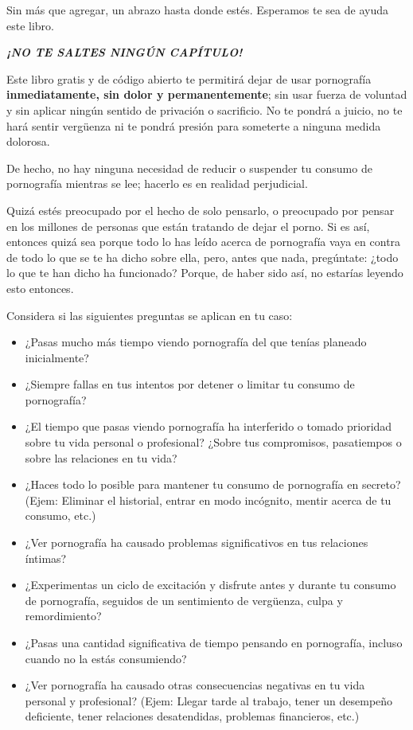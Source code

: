 \documentclass[
  spanish,
  openany]{book}
\providecommand{\tightlist}{%
  \setlength{\itemsep}{0pt}\setlength{\parskip}{0pt}}
\begin{document}
Sin más que agregar, un abrazo hasta donde estés. Esperamos te sea de ayuda este libro.

{\emph{\textbf{¡NO TE SALTES NINGÚN CAPÍTULO!}}}

Este libro gratis y de código abierto te permitirá dejar de usar pornografía \textbf{inmediatamente, sin dolor y permanentemente}; sin usar fuerza de voluntad y sin aplicar ningún sentido de privación o sacrificio. No te pondrá a juicio, no te hará sentir vergüenza ni te pondrá presión para someterte a ninguna medida dolorosa.

De hecho, no hay ninguna necesidad de reducir o suspender tu consumo de pornografía mientras se lee; hacerlo es en realidad perjudicial.

Quizá estés preocupado por el hecho de solo pensarlo, o preocupado por pensar en los millones de personas que están tratando de dejar el porno. Si es así, entonces quizá sea porque todo lo has leído acerca de pornografía vaya en contra de todo lo que se te ha dicho sobre ella, pero, antes que nada, pregúntate: ¿todo lo que te han dicho ha funcionado? Porque, de haber sido así, no estarías leyendo esto entonces.

Considera si las siguientes preguntas se aplican en tu caso:

\begin{itemize}
\tightlist
\item
  ¿Pasas mucho más tiempo viendo pornografía del que tenías planeado inicialmente?
\item
  ¿Siempre fallas en tus intentos por detener o limitar tu consumo de pornografía?
\item
  ¿El tiempo que pasas viendo pornografía ha interferido o tomado prioridad sobre tu vida personal o profesional? ¿Sobre tus compromisos, pasatiempos o sobre las relaciones en tu vida?
\item
  ¿Haces todo lo posible para mantener tu consumo de pornografía en secreto? (Ejem: Eliminar el historial, entrar en modo incógnito, mentir acerca de tu consumo, etc.)
\item
  ¿Ver pornografía ha causado problemas significativos en tus relaciones íntimas?
\item
  ¿Experimentas un ciclo de excitación y disfrute antes y durante tu consumo de pornografía, seguidos de un sentimiento de vergüenza, culpa y remordimiento?
\item
  ¿Pasas una cantidad significativa de tiempo pensando en pornografía, incluso cuando no la estás consumiendo?
\item
  ¿Ver pornografía ha causado otras consecuencias negativas en tu vida personal y profesional? (Ejem: Llegar tarde al trabajo, tener un desempeño deficiente, tener relaciones desatendidas, problemas financieros, etc.)
\end{itemize}
\end{document}
